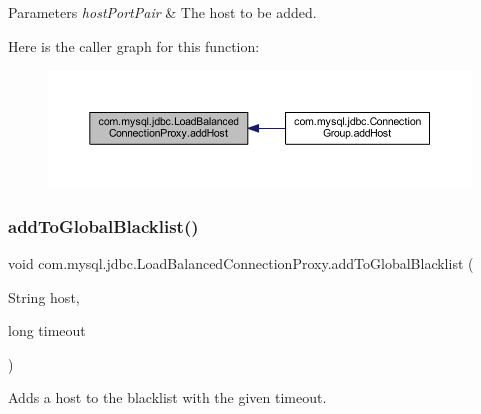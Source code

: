 \begin{DoxyParams}{Parameters}
{\em host\+Port\+Pair} & The host to be added. \\
\hline
\end{DoxyParams}
Here is the caller graph for this function\+:
\nopagebreak
\begin{figure}[H]
\begin{center}
\leavevmode
\includegraphics[width=350pt]{classcom_1_1mysql_1_1jdbc_1_1_load_balanced_connection_proxy_afad99a08e4cfd9adad2936525d56d49e_icgraph}
\end{center}
\end{figure}
\mbox{\label{classcom_1_1mysql_1_1jdbc_1_1_load_balanced_connection_proxy_a93dad34c094b301be7cb59b0fe7c01da}} 
\subsubsection{\texorpdfstring{add\+To\+Global\+Blacklist()}{addToGlobalBlacklist()}\hspace{0.1cm}{\footnotesize\ttfamily [1/2]}}
{\footnotesize\ttfamily void com.\+mysql.\+jdbc.\+Load\+Balanced\+Connection\+Proxy.\+add\+To\+Global\+Blacklist (\begin{DoxyParamCaption}\item[{String}]{host,  }\item[{long}]{timeout }\end{DoxyParamCaption})}

Adds a host to the blacklist with the given timeout.


